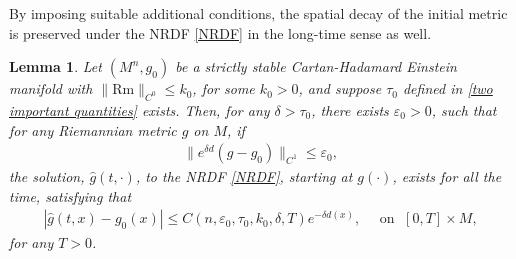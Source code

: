 \documentclass[12pt]{amsart}
\newtheorem{lemma}{Lemma}[section]
\begin{document}
By imposing suitable additional conditions, the spatial decay of the initial metric is preserved under the NRDF \eqref{NRDF} in the long-time sense as well.
\begin{lemma}\label{long time existence with short time weight}
    Let $(M^n, g_0)$ be a strictly stable Cartan-Hadamard Einstein manifold with $\|\mathrm{Rm}\|_{C^0}\leq k_0$, for some $k_0 > 0$, and suppose $\tau_0$ defined in \eqref{two important quantities} exists. Then, for any $\delta > \tau_0$, there exists $\varepsilon_0 > 0$, such that for any Riemannian metric $g$ on $M$, if 
    \begin{align}\label{long time existence with short time weight condition 1}
        \|e^{\delta d}(g - g_0)\|_{C^1} \leq \varepsilon_0, 
    \end{align}
    the solution, $\hat{g}(t, \cdot)$, to the NRDF \eqref{NRDF}, starting at $g(\cdot)$, exists for all the time, satisfying that 
    \begin{align}\label{long time existence with short time weight result}
        |\hat{g}(t, x) - g_0(x)| \leq C(n, \varepsilon_0, \tau_0, k_0, \delta, T) e^{-\delta d(x)}, \quad \text{ on }\; [0, T]\times M,
    \end{align}
    for any $T > 0$. 
\end{lemma}
\end{document}
